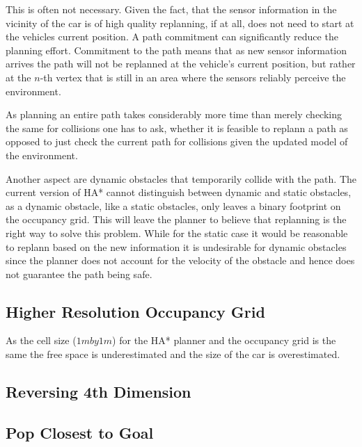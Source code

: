 	This is often not necessary. Given the fact, that the sensor information in the vicinity of the car is of high quality replanning, if at all, does not need to start at the vehicles current position. A path commitment can significantly reduce the planning effort. Commitment to the path means that as new sensor information arrives the path will not be replanned at the vehicle's current position, but rather at the $n$-th vertex that is still in an area where the sensors reliably perceive the environment.
	
	As planning an entire path takes considerably more time than merely checking the same for collisions one has to ask, whether it is feasible to replann a path as opposed to just check the current path for collisions given the updated model of the environment.
	
	Another aspect are dynamic obstacles that temporarily collide with the path. The current version of HA* cannot distinguish between dynamic and static obstacles, as a dynamic obstacle, like a static obstacles, only leaves a binary footprint on the occupancy grid. This will leave the planner to believe that replanning is the right way to solve this problem. While for the static case it would be reasonable to replann based on the new information it is undesirable for dynamic obstacles since the planner does not account for the velocity of the obstacle and hence does not guarantee the path being safe.
	
\subsection{Higher Resolution Occupancy Grid}
As the cell size ($1 m by 1 m$) for the HA* planner and the occupancy grid is the same the free space is underestimated and the size of the car is overestimated.
	
\subsection{Reversing 4th Dimension}

\subsection{Pop Closest to Goal}